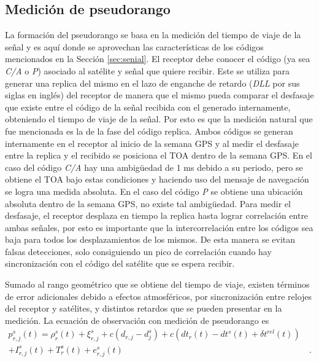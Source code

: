 \documentclass[a4paper,12pt,oneside,onecolumn,final,openright]{book}%
\begin{document}
\subsection{Medición de pseudorango}
	La formación del pseudorango se basa en la medición del tiempo de viaje de la señal y es aquí donde se aprovechan las características de los códigos mencionados en la Sección \ref{sec:senial}. El receptor debe conocer el código (ya sea \textit{C/A} o \textit{P}) asociado al satélite y señal que quiere recibir. Este se utiliza para generar una replica del mismo en el lazo de enganche de retardo (\textit{DLL} por sus siglas en inglés) del receptor de manera que el mismo pueda comparar el desfasaje que existe entre el código de la señal recibida con el generado internamente, obteniendo el tiempo de viaje de la señal. Por esto es que la medición natural que fue mencionada es la de la fase del código replica. Ambos códigos se generan internamente en el receptor al inicio de la semana GPS y al medir el desfasaje entre la replica y el recibido se posiciona el TOA dentro de la semana GPS. En el caso del código \textit{C/A} hay una ambigüedad de 1 ms debido a su periodo, pero se obtiene el TOA bajo estas condiciones y haciendo uso del mensaje de navegación se logra una medida absoluta. En el caso del código \textit{P} se obtiene una ubicación absoluta dentro de la semana GPS, no existe tal ambigüedad. Para medir el desfasaje, el receptor desplaza en tiempo la replica hasta lograr correlación entre ambas señales, por esto es importante que la intercorrelación entre los códigos sea baja para todos los desplazamientos de los mismos. De esta manera se evitan falsas detecciones, solo consiguiendo un pico de correlación cuando hay sincronización con el código del satélite que se espera recibir.
	
	Sumado al rango geométrico que se obtiene del tiempo de viaje, existen términos de error adicionales debido a efectos atmosféricos, por sincronización entre relojes del receptor y satélites, y distintos retardos que se pueden presentar en la medición. La ecuación de observación con medición de pseudorango es 
\begin{align}\label{ec:obs_pseudorango}
	p_{r,j}^s(t) = \rho_r^s(t) + \xi_{r,j}^s + c\left(d_{r,j}-d_j^s\right) + c\left(dt_r(t)-dt^s(t)+\delta t^{rel}(t)\right)& \\ 
	+ I_{r,j}^s(t) + T_r^s(t) +e_{r,j}^s(t)& \ . \nonumber
\end{align}
\end{document}
